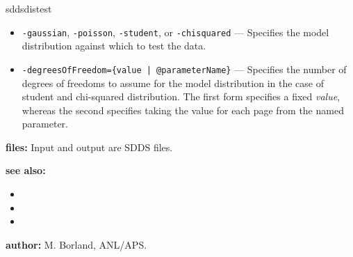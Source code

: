 \begin{sddsprog}{sddsdistest}
\begin{itemize}
      \item \verb|-gaussian|, \verb|-poisson|, \verb|-student|, or \verb|-chisquared| --- Specifies the model distribution against which to test the data.
      \item \verb!-degreesOfFreedom={value | @parameterName}! --- Specifies the number of degrees of freedoms to assume for the model distribution in the case of student and chi-squared distribution. The first form specifies a fixed \emph{value}, whereas the second specifies taking the value for each page from the named parameter.
    \end{itemize}
  \item \textbf{files:}
    Input and output are SDDS files.
  \item \textbf{see also:}
    \begin{itemize}
      \item {}
      \item {}
      \item {}
    \end{itemize}
  \item \textbf{author:} M. Borland, ANL/APS.
\end{sddsprog}



